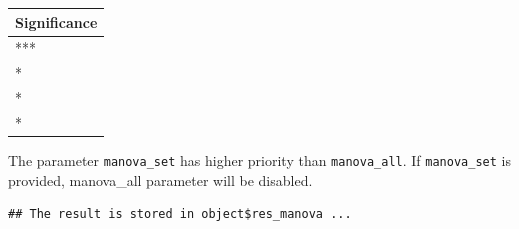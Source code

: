 \documentclass[
]{book}
\newenvironment{Shaded}{\begin{snugshade}}{\end{snugshade}}
\newcommand{\AttributeTok}[1]{\textcolor[rgb]{0.13,0.29,0.53}{#1}}
\newcommand{\CommentTok}[1]{\textcolor[rgb]{0.56,0.35,0.01}{\textit{#1}}}
\newcommand{\FunctionTok}[1]{\textcolor[rgb]{0.13,0.29,0.53}{\textbf{#1}}}
\newcommand{\NormalTok}[1]{#1}
\newcommand{\SpecialCharTok}[1]{\textcolor[rgb]{0.81,0.36,0.00}{\textbf{#1}}}
\newcommand{\StringTok}[1]{\textcolor[rgb]{0.31,0.60,0.02}{#1}}
\newcounter{none} %
\begin{document}
{\def\LTcaptype{none} %
\begin{longtable}[]{@{}
  >{\centering\arraybackslash}p{}@{}}
\toprule\noalign{}
\begin{minipage}[b]{\linewidth}\centering
Significance
\end{minipage} \\
\midrule\noalign{}
\endhead
\bottomrule\noalign{}
\endlastfoot
*** \\
** \\
** \\
** \\
\end{longtable}
}

The parameter \texttt{manova\_set} has higher priority than \texttt{manova\_all}. If \texttt{manova\_set} is provided, manova\_all parameter will be disabled.

\begin{Shaded}
\end{Shaded}

\begin{verbatim}
## The result is stored in object$res_manova ...
\end{verbatim}
\end{document}
